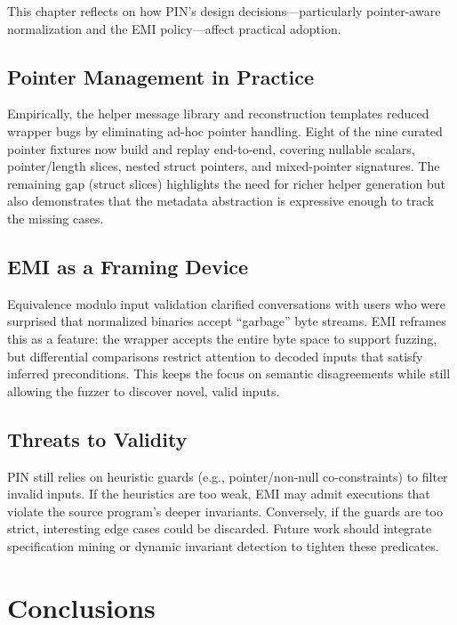 \documentclass[doublespace,nopageskip]{VTthesis} %
\begin{document}
This chapter reflects on how PIN's design decisions---particularly pointer-aware normalization and the EMI policy---affect practical adoption.

\section{Pointer Management in Practice}

Empirically, the helper message library and reconstruction templates reduced wrapper bugs by eliminating ad-hoc pointer handling. Eight of the nine curated pointer fixtures now build and replay end-to-end, covering nullable scalars, pointer/length slices, nested struct pointers, and mixed-pointer signatures. The remaining gap (struct slices) highlights the need for richer helper generation but also demonstrates that the metadata abstraction is expressive enough to track the missing cases.

\section{EMI as a Framing Device}

Equivalence modulo input validation clarified conversations with users who were surprised that normalized binaries accept ``garbage'' byte streams. EMI reframes this as a feature: the wrapper accepts the entire byte space to support fuzzing, but differential comparisons restrict attention to decoded inputs that satisfy inferred preconditions. This keeps the focus on semantic disagreements while still allowing the fuzzer to discover novel, valid inputs.

\section{Threats to Validity}

PIN still relies on heuristic guards (e.g., pointer/non-null co-constraints) to filter invalid inputs. If the heuristics are too weak, EMI may admit executions that violate the source program's deeper invariants. Conversely, if the guards are too strict, interesting edge cases could be discarded. Future work should integrate specification mining or dynamic invariant detection to tighten these predicates.

\chapter{Conclusions} \label{ch:conclusions}
\end{document}
